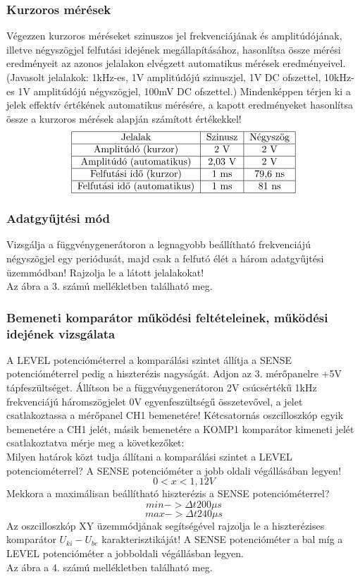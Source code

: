 \documentclass[10pt,a4paper]{article}
\begin{document}
	\subsubsection{Kurzoros mérések}
	Végezzen kurzoros méréseket szinuszos jel frekvenciájának
és amplitúdójának, illetve négyszögjel felfutási idejének
megállapításához, hasonlítsa össze mérési eredményeit az
azonos jelalakon elvégzett automatikus mérések
eredményeivel. (Javasolt jelalakok: 1kHz-es, 1V amplitúdójú
szinuszjel, 1V DC ofszettel, 10kHz-es 1V amplitúdójú
négyszögjel, 100mV DC ofszettel.) Mindenképpen térjen ki a
jelek effektív értékének automatikus mérésére, a kapott
eredményeket hasonlítsa össze a kurzoros mérések alapján
számított értékekkel!$$\begin{tabular}{|c|c|c|}
\hline 
Jelalak & Szinusz & Négyszög \\ 
\hline 
 Amplitúdó (kurzor) & 2 V & 2 V \\ 
\hline 
Amplitúdó (automatikus) & 2,03 V & 2 V \\ 
\hline 
 Felfutási idő (kurzor) & 1 ms & 79,6 ns \\ 
\hline 
Felfutási idő (automatikus) & 1 ms & 81 ns \\ 
\hline 
\end{tabular} $$ 
 \subsubsection{Adatgyűjtési mód}
 	Vizsgálja a függvénygenerátoron a legnagyobb beállítható
frekvenciájú négyszögjel egy periódusát, majd csak a felfutó
élét a három adatgyűjtési üzemmódban! Rajzolja le a látott
jelalakokat! $$$$ Az ábra a 3. számú mellékletben található meg.
	\subsubsection{Bemeneti komparátor működési feltételeinek, működési idejének vizsgálata}
	A LEVEL potencióméterrel a komparálási szintet állítja a SENSE
potencióméterrel pedig a hiszterézis nagyságát.
Adjon az 3. mérőpanelre +5V tápfeszültséget. Állítson be a
függvénygenerátoron 2V csúcsértékű 1kHz frekvenciájú háromszögjelet 0V
egyenfeszültségű összetevővel, a jelet csatlakoztassa a mérőpanel CH1
bemenetére! Kétcsatornás oszcilloszkóp egyik bemenetére a CH1 jelét, másik bemenetére
a KOMP1 komparátor kimeneti jelét csatlakoztatva mérje meg a
következőket: $$$$
	Milyen határok közt tudja állítani a komparálási szintet a LEVEL
potenciométerrel? A SENSE potencióméter a jobb oldali végállásában
legyen! $$0<x<1,12 V$$
	Mekkora a maximálisan beállítható hiszterézis a SENSE potencióméterrel?
	$$min -> \Delta t 200 \mu s$$
	$$max -> \Delta t 240 \mu s$$
	Az oszcilloszkóp XY üzemmódjának segítségével rajzolja le a
hiszterézises komparátor $U_{ki}-U_{be}$ karakterisztikáját! A SENSE
potencióméter a bal míg a LEVEL potencióméter a jobboldali
végállásban legyen.$$$$ Az ábra a 4. számú mellékletben található meg.
\end{document}
